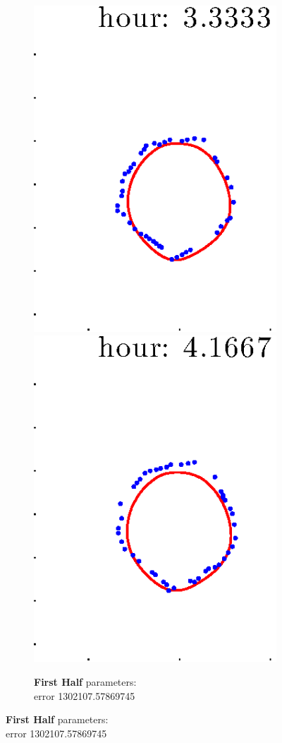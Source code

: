 \documentclass[12pt]{article}
\begin{document}
\begin{figure}[h!]
\begin{subfigure}[b]{.3\textwidth}
		\includegraphics[height=.15\textheight]{Pos14exp8/firsthalf/first5.eps}
		\includegraphics[height=.15\textheight]{Pos14exp8/firsthalf/first6.eps}
		\caption{\textbf{First Half} parameters: \\error 1302107.57869745}

\end{subfigure}
\end{figure}
\end{document}
